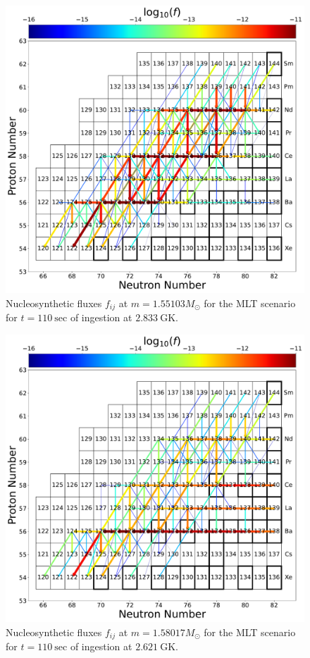 \begin{figure}[!htbp]
\includegraphics[width=\textwidth]{chapters/2/figures/ce136_network_m1.55551.pdf}
\caption{Nucleosynthetic fluxes $f_{ij}$ at $m=1.55103 M_\odot$ for the MLT scenario for $t=110~\mathrm{sec}$ of ingestion at $2.833~\mathrm{GK}$.
\label{fig:convreacflow1}}
\end{figure}

\begin{figure}[!htbp]
\includegraphics[width=\textwidth]{chapters/2/figures/ce136_network_m1.58017.pdf}
\caption{Nucleosynthetic fluxes $f_{ij}$ at $m=1.58017 M_\odot$ for the MLT scenario for $t=110~\mathrm{sec}$ of ingestion at $2.621~\mathrm{GK}$.
\label{fig:convreacflow2}}
\end{figure}

